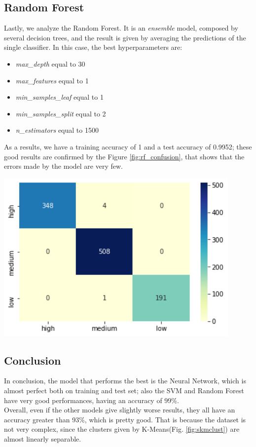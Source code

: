 \subsection{Random Forest}
\begin{minipage}{0.59\textwidth}
Lastly, we analyze the Random Forest. It is an \emph{ensemble} model, composed by several decision trees, and the result is given by averaging the predictions of the single classifier.
In this case, the best hyperparameters are:
\begin{itemize}
\item \emph{max\_depth} equal to 30
\item \emph{max\_features} equal to 1
\item \emph{min\_samples\_leaf} equal to 1
\item \emph{min\_samples\_split} equal to 2
\item \emph{n\_estimators} equal to 1500
\end{itemize}
As a results, we have a training accuracy of 1 and a test accuracy of 0.9952; these good results are confirmed by the Figure \ref{fig:rf_confusion}, that shows that the errors made by the model are very few.
\end{minipage}
\begin{minipage}{0.4\textwidth}
\centering
\includegraphics[width=0.90\textwidth]{img/rf_confusion.png}
\captionsetup{justification=centering}
\label{fig:rf_confusion}
\end{minipage}

\subsection{Conclusion}
In conclusion, the model that performs the best is the Neural Network, which is almost perfect both on training and test set; also the SVM and Random Forest have very good performances, having an accuracy of 99\%.\\
Overall, even if the other models give slightly worse results, they all have an accuracy greater than 93\%, which is pretty good. That is because the dataset is not very complex, since the clusters given by K-Means(Fig. \ref{fig:skmclust}) are almost linearly separable.
